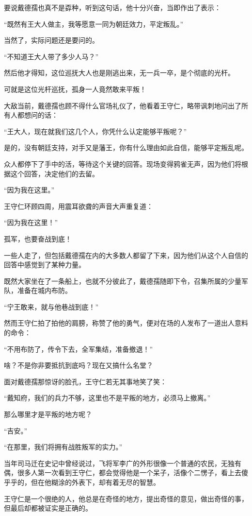 \begin{multicols}{\theparacolNo}
		要说戴德孺也真不是孬种，听到这句话，他十分兴奋，当即作出了表示：

		“既然有王大人做主，我等愿意一同为朝廷效力，平定叛乱。”

		当然了，实际问题还是要问的。

		“不知道王大人带了多少人马？”

		然后他才得知，这位巡抚大人也是刚逃出来，无一兵一卒，是个彻底的光杆。

		可就是这位光杆巡抚，孤身一人竟然敢来平叛！

		大敌当前，戴德孺也顾不得什么官场礼仪了，他看着王守仁，略带讽刺地问出了所有人都想问的话：

		“王大人，现在就我们这几个人，你凭什么认定能够平叛呢？”

		是的，没有朝廷支持，对手又是藩王，你有什么理由如此自信，能够平定叛乱呢。

		众人都停下了手中的活，等待这个关键的回答。现场变得鸦雀无声，因为他们将根据这个回答，决定他们的去留。

		“因为我在这里。”

		王守仁环顾四周，用震耳欲聋的声音大声重复道：

		“因为我在这里！”

		孤军，也要奋战到底！

		一些人走了，但包括戴德孺在内的大多数人都留了下来，因为他们从这个人自信的回答中感觉到了某种力量。

		既然大家坐在了一条船上，也就不分彼此了，戴德孺随即下令，召集所属的少量军队，准备在城内布防。

		“宁王敢来，就与他巷战到底！”

		然而王守仁拍了拍他的肩膀，称赞了他的勇气，便对在场的人发布了一道出人意料的命令：

		“不用布防了，传令下去，全军集结，准备撤退！”

		啥？不是你非要抵抗到底吗？现在又搞什么名堂？

		面对戴德孺那惊讶的脸孔，王守仁若无其事地笑了笑：

		“戴知府，我们的兵力不够，这里也不是平叛的地方，必须马上撤离。”

		那么哪里才是平叛的地方呢？

		“吉安。”

		“在那里，我们将拥有战胜叛军的实力。”

		当年司马迁在史记中曾经说过，飞将军李广的外形很像一个普通的农民，无独有偶，很多人第一次看到王守仁，都会觉得他是一个呆子，活像个二愣子，看上去傻乎乎的，但在他糊涂的外表下，却有着无尽的智慧。

		王守仁是一个很绝的人，他总是在奇怪的地方，提出奇怪的意见，做出奇怪的事，但最后却都被证实是正确的。


\end{multicols}
